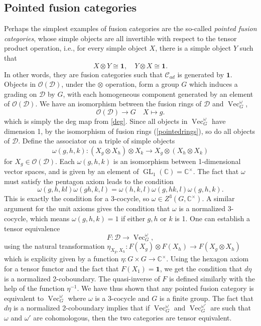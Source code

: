 \documentclass[11pt]{book}
\theoremstyle{Rem}
\theoremstyle{definition}
\numberwithin{equation}{section}
\newcommand\inv{^{-1}}
\newcommand\ot{\otimes}
\newcommand\Vect{\operatorname{Vec}}
\newcommand\GL{\operatorname{GL}}
\newcommand\CC{\mathbb C}
\newcommand\kk{\mathbb C}
\newcommand\C{\mathcal C}
\newcommand\OO{\mathcal O}
\newcommand\D{\mathcal D}
\newcommand\one{\mathbf{1}}
\begin{document}
\fi


\subsection{Pointed fusion categories}\label{pfc}
Perhaps the simplest examples of fusion categories are the so-called \textit{pointed fusion categories}, whose simple objects are all invertible with respect to the tensor product operation, i.e., for every simple object $X$, there is a simple object $Y$ such that \begin{equation}
	X\otimes Y \cong \one, \quad Y\otimes X\cong \one.
\end{equation}
In other words, they are fusion categories such that $\C_{ad}$ is generated by $\one$. 
Objects in  $\OO(\D)$, under the $\ot$ operation, form a group $G$ which induces a grading on $\D$ by $G$, with each homogeneous component generated by an element of $\OO(\D)$. We have an isomorphism between the fusion rings of $\D$ and $\Vect^\omega_G$,  \begin{equation}
	\OO (\D) \rightarrow G \quad X\mapsto g. \label{pointedrings}
\end{equation} which is simply the deg map from \eqref{deg}. Since all objects in $\Vect_G^\omega$ have dimension 1, by the isomorphism of fusion rings (\ref{pointedrings}), so do all objects of $\D$.
Define the associator on a triple of simple objects\begin{equation}
	\omega(g,h,k):(X_g \otimes X_h) \otimes X_k \rightarrow    X_g \otimes (X_h\otimes X_k)
\end{equation} for $X_g \in \OO(\D)$. 
 Each $\omega(g,h,k)$ is an isomorphism between 1-dimensional vector spaces, and is given by an element of $\GL_1(\kk) = \kk^\times$.  The fact that $\omega$ must satisfy the pentagon axiom leads to the condition \begin{equation}
	\omega(g,h, kl)\omega(gh, k, l) = \omega(h,k,l)\omega(g, hk, l)\omega(g,h,k).
\end{equation} This is exactly the condition for a 3-cocycle, so $\omega \in Z^3(G, \CC^\times)$.  A similar argument for the unit axioms gives the condition that $\omega$ is a normalized 3-cocycle, which means $\omega(g, h, k)=1$ if either $g, h$ or $k$ is 1. One can establish a tensor equivalence \begin{equation}
	F: \D \rightarrow \Vect^\omega_G,
\end{equation} using the natural transformation $\eta_{X_g,X_h}: F(X_g)\otimes F(X_h) \rightarrow F(X_g\otimes X_h)$ which is explicity given by a function $\eta:G\times G \rightarrow \kk^\times$. Using the hexagon axiom for a tensor functor and the fact that $F(X_1) = \one$, we get the condition that $d\eta$ is a normalized 2-coboundary. The quasi-inverse of $F$ is defined similarly with the help of the function $\eta\inv$. We have thus shown that any pointed fusion category is equivalent to $\Vect^\omega_G$ where $\omega$ is a 3-cocycle and $G$ is a finite group. The fact that $d\eta$ is a normalized 2-coboundary implies that if $\Vect^\omega_G$ and $\Vect^{\omega'}_G$ are such that $\omega $ and $\omega'$ are cohomologous, then the two categories are tensor equivalent.
\end{document}
